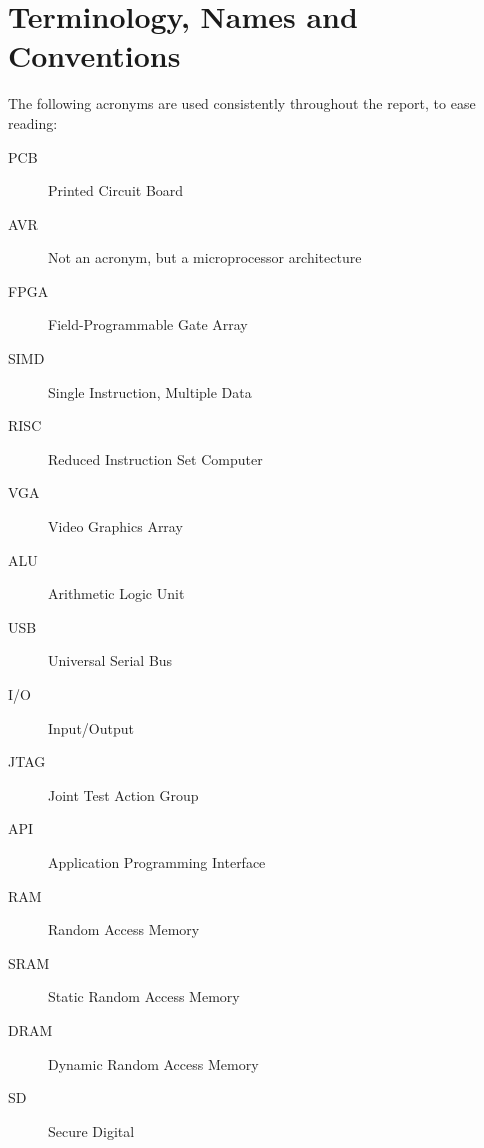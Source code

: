 \section{Terminology, Names and Conventions}
The following acronyms are used consistently throughout the report, to ease
reading: 

\begin{description}
\item[PCB] Printed Circuit Board
\item[AVR] Not an acronym, but a microprocessor architecture
\item[FPGA] Field-Programmable Gate Array
\item[SIMD] Single Instruction, Multiple Data 
\item[RISC] Reduced Instruction Set Computer
\item[VGA] Video Graphics Array
\item[ALU] Arithmetic Logic Unit
\item[USB] Universal Serial Bus
\item[I/O] Input/Output
\item[JTAG] Joint Test Action Group
\item[API] Application Programming Interface
\item[RAM] Random Access Memory
\item[SRAM] Static Random Access Memory
\item[DRAM] Dynamic Random Access Memory
\item[SD] Secure Digital
\end{description}
